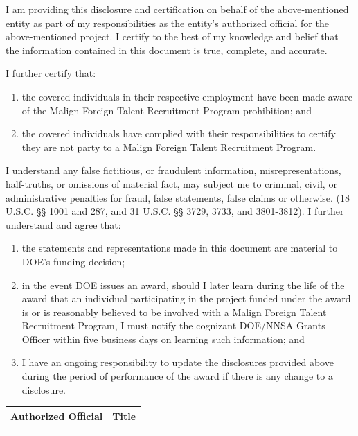 \documentclass[
]{article}
\providecommand{\tightlist}{%
  \setlength{\itemsep}{0pt}\setlength{\parskip}{0pt}}
\begin{document}
I am providing this disclosure and certification on behalf of the
above-mentioned entity as part of my responsibilities as the entity's
authorized official for the above-mentioned project. I certify to the
best of my knowledge and belief that the information contained in this
document is true, complete, and accurate.

I further certify that:

\begin{enumerate}
\def\labelenumi{\arabic{enumi}.}
\tightlist
\item
  the covered individuals in their respective employment have been made
  aware of the Malign Foreign Talent Recruitment Program prohibition;
  and
\item
  the covered individuals have complied with their responsibilities to
  certify they are not party to a Malign Foreign Talent Recruitment
  Program.
\end{enumerate}

I understand any false fictitious, or fraudulent information,
misrepresentations, half-truths, or omissions of material fact, may
subject me to criminal, civil, or administrative penalties for fraud,
false statements, false claims or otherwise. (18 U.S.C. §§ 1001 and 287,
and 31 U.S.C. §§ 3729, 3733, and 3801-3812). I further understand and
agree that:

\begin{enumerate}
\def\labelenumi{\arabic{enumi}.}
\tightlist
\item
  the statements and representations made in this document are material
  to DOE's funding decision;
\item
  in the event DOE issues an award, should I later learn during the life
  of the award that an individual participating in the project funded
  under the award is or is reasonably believed to be involved with a
  Malign Foreign Talent Recruitment Program, I must notify the cognizant
  DOE/NNSA Grants Officer within five business days on learning such
  information; and
\item
  I have an ongoing responsibility to update the disclosures provided
  above during the period of performance of the award if there is any
  change to a disclosure.
\end{enumerate}

\begin{longtable}[]{@{}ll@{}}
\toprule\noalign{}
Authorized Official & Title \\
\midrule\noalign{}
\endhead
\bottomrule\noalign{}
\endlastfoot
& \\
\end{longtable}
\end{document}
